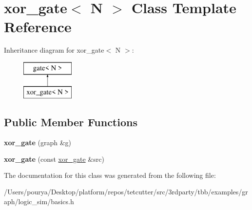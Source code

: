 \hypertarget{classxor__gate}{}\section{xor\+\_\+gate$<$ N $>$ Class Template Reference}
\label{classxor__gate}
Inheritance diagram for xor\+\_\+gate$<$ N $>$\+:\begin{figure}[H]
\begin{center}
\leavevmode
\includegraphics[height=2.000000cm]{classxor__gate}
\end{center}
\end{figure}
\subsection*{Public Member Functions}
\begin{DoxyCompactItemize}
\item 
\hypertarget{classxor__gate_adbb08e606e034e788bf7d72fa20f5c5a}{}{\bfseries xor\+\_\+gate} (graph \&g)\label{classxor__gate_adbb08e606e034e788bf7d72fa20f5c5a}

\item 
\hypertarget{classxor__gate_a09cf54ec20b6f0f37f605b2be642fd8b}{}{\bfseries xor\+\_\+gate} (const \hyperlink{classxor__gate}{xor\+\_\+gate} \&src)\label{classxor__gate_a09cf54ec20b6f0f37f605b2be642fd8b}

\end{DoxyCompactItemize}


The documentation for this class was generated from the following file\+:\begin{DoxyCompactItemize}
\item 
/\+Users/pourya/\+Desktop/platform/repos/tetcutter/src/3rdparty/tbb/examples/graph/logic\+\_\+sim/basics.\+h\end{DoxyCompactItemize}
